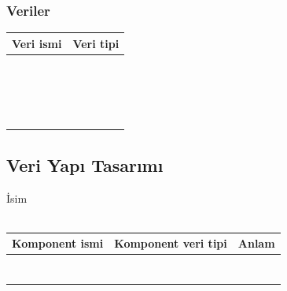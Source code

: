 \documentclass[12pt, a4paper]{article}
\newcommand\fillin[1][3cm]{\makebox[#1]{\dotfill}}
\begin{document}
\subsubsection*{Veriler}
\begin{tabular}{| p{4cm} | p{11cm} |  }
\hline			
Veri ismi&Veri tipi\\
\hline
& \\[2ex]
\hline  
& \\[2ex]
\hline  
& \\[2ex]
\hline  
& \\[2ex]
\hline  
& \\[2ex]
\hline  
& \\[2ex]
\hline  
& \\[2ex]
\hline  
& \\[2ex]
\hline  
& \\[2ex]
\hline  
& \\[2ex]
\hline  
& \\[2ex]
\hline  
& \\[2ex]
\hline  
& \\[2ex]
\hline  
& \\[2ex]
\hline  
& \\[2ex]
\hline  
& \\[2ex]
\hline  
& \\[2ex]
\hline  
& \\[2ex]
\hline  
\end{tabular}



\newpage
\subsection*{Veri Yapı Tasarımı}
İsim  \fillin[5cm]\\
\vspace{0.5cm}\\
\begin{tabular}{| p{4cm} | p{4cm} | p{8cm} |  }
\hline			
Komponent ismi&Komponent veri tipi&Anlam\\
\hline
& & \\[10ex]
\hline  
& & \\[10ex]
\hline  
& & \\[10ex]
\hline  
& & \\[10ex]
\hline  
& & \\[10ex]
\hline  
& & \\[10ex]
\hline  
& & \\[10ex]
\hline  
\end{tabular}
\end{document}
